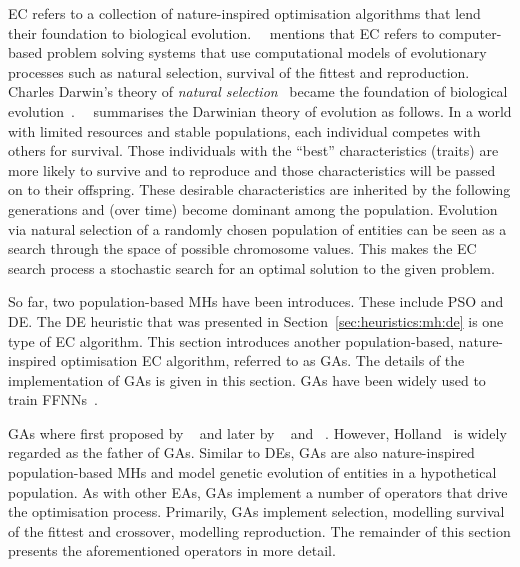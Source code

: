 \Ac{EC} refers to a collection of nature-inspired optimisation algorithms that lend their foundation to biological evolution.~\citeauthor{ref:engelbrecht:2007}~\cite{ref:engelbrecht:2007} mentions that \acs{EC} refers to computer-based problem solving systems that use computational models of evolutionary processes such as natural selection, survival of the fittest and reproduction. Charles Darwin's theory of \textit{natural selection}~\cite{ref:darwin:2012} became the foundation of biological evolution~\cite{ref:darwin:1987}.~\citeauthor{ref:engelbrecht:2007}~\cite{ref:engelbrecht:2007} summarises the Darwinian theory of evolution as follows. In a world with limited resources and stable populations, each individual competes with others for survival. Those individuals with the ``best'' characteristics (traits) are more likely to survive and to reproduce and those characteristics will be passed on to their offspring. These desirable characteristics are inherited by the following generations and (over time) become dominant among the population. Evolution via natural selection of a randomly chosen population of entities can be seen as a search through the space of possible chromosome values. This makes the \acs{EC} search process a stochastic search for an optimal solution to the given problem.

So far, two population-based \acp{MH} have been introduces. These include \acs{PSO} and \acs{DE}. The \acs{DE} heuristic that was presented in Section~\ref{sec:heuristics:mh:de} is one type of \acs{EC} algorithm. This section introduces another population-based, nature-inspired optimisation \acs{EC} algorithm, referred to as \acfp{GA}. The details of the implementation of \acp{GA} is given in this section. \acp{GA} have been widely used to train \acp{FFNN}~\cite{ref:montana:1989, ref:siddique:2001, ref:miller:1989}.

\Acp{GA} where first proposed by \citeauthor{ref:fraser:1957}~\cite{ref:fraser:1957} and later by \citeauthor{ref:bremermann:1962}~\cite{ref:bremermann:1962} and \citeauthor{ref:reed:1967}~\cite{ref:reed:1967}. However, Holland~\cite{ref:holland:1992} is widely regarded as the father of \acp{GA}. Similar to \acp{DE}, \acp{GA} are also nature-inspired population-based \acp{MH} and model genetic evolution of entities in a hypothetical population. As with other \acp{EA}, \acp{GA} implement a number of operators that drive the optimisation process. Primarily, \acp{GA} implement selection, modelling survival of the fittest and crossover, modelling reproduction. The remainder of this section presents the aforementioned operators in more detail.

